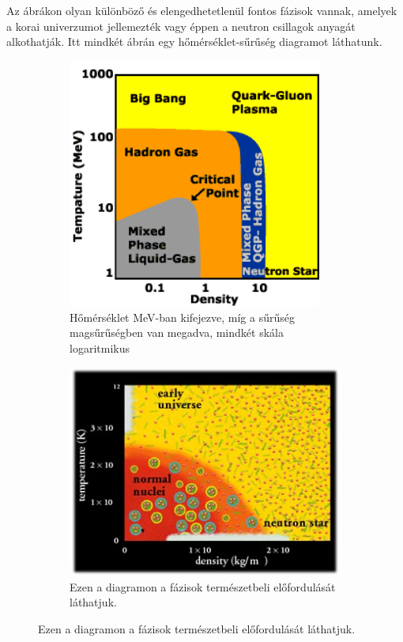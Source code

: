 \documentclass[a4paper,12pt]{article}
\begin{document}
Az ábrákon olyan különböző és elengedhetetlenül fontos fázisok vannak, amelyek a korai univerzumot jellemezték vagy éppen
a neutron csillagok anyagát alkothatják. Itt mindkét ábrán egy hőmérséklet-sűrűség diagramot láthatunk.
\begin{figure}[H]
	\centering
	\begin{subfigure}{.49\textwidth}
		\centering
		\includegraphics[width=0.92\textwidth]{cbm_phase1.png}
		\caption{ Hőmérséklet MeV-ban kifejezve, míg a sűrűség magsűrűségben van megadva, mindkét skála logaritmikus }
	\end{subfigure}
	\begin{subfigure}{.49\textwidth}
		\includegraphics[width=.92\textwidth]{cbm_phase2.jpg}
		\caption{ Ezen a diagramon a fázisok természetbeli előfordulását láthatjuk. }
	\end{subfigure}
\end{figure}
\end{document}
